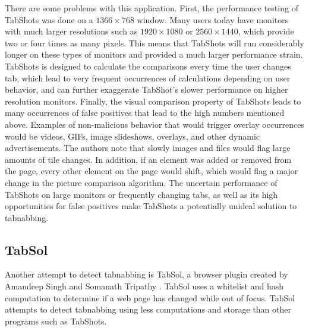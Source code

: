 \documentclass[12pt]{article}
\begin{document}
\begin{doublespace}
There are some problems with this application.  First, the performance testing of TabShots was done on a $1366 \times 768$ window.  Many users today have monitors with much larger resolutions such as $1920 \times 1080$ or $2560 \times 1440$, which provide two or four times as many pixels.  This means that TabShots will run considerably longer on these types of monitors and provided a much larger performance strain.  TabShots is designed to calculate the comparisons every time the user changes tab, which lead to very frequent occurrences of calculations depending on user behavior, and can further exaggerate TabShot's slower performance on higher resolution monitors.  Finally, the visual comparison property of TabShots leads to many occurrences of false positives that lead to the high numbers mentioned above.  Examples of non-malicious behavior that would trigger overlay occurrences would be videos, GIFs, image slideshows, overlays, and other dynamic advertisements.  The authors note that slowly images and files would flag large amounts of tile changes.  In addition, if an element was added or removed from the page, every other element on the page would shift, which would flag a major change in the picture comparison algorithm.  The uncertain performance of TabShots on large monitors or frequently changing tabs, as well as its high opportunities for false positives make TabShots a potentially unideal solution to tabnabbing. 
\subsection{TabSol}
\begin{comment}
Another defense against tabnabbing, TabSol created by Amandeep Singh and Somanath Tripathy \cite{TabSol}, compares the hash values of the web page to detect changes and notifies the user. 
\end{comment}

Another attempt to detect tabnabbing is TabSol, a browser plugin created by Amandeep Singh and Somanath Tripathy \cite{TabSol}.  TabSol uses a whitelist and hash computation to determine if a web page has changed while out of focus.  TabSol attempts to detect tabnabbing using less computations and storage than other programs such as TabShots.


\end{doublespace}
\end{document}
